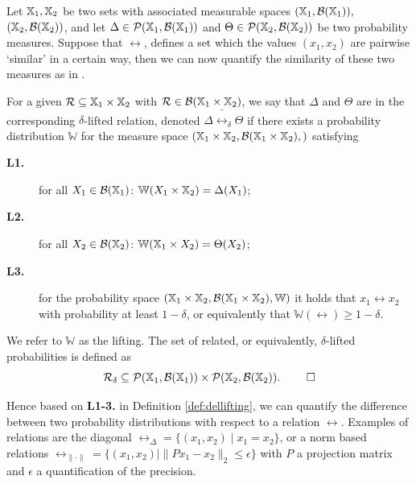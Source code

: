 \documentclass{ifacconf}
\renewcommand{\axx}[1]{{\color{orange} Ali: #1}}
\newcommand{\new}[1]{{\color{blue}#1}}
\begin{document}
	Let ${\mathbb{X}}_1,{\mathbb{X}}_2$ be two sets with associated measurable spaces $({\mathbb{X}}_1,\mathcal B({\mathbb{X}}_1)),$ $({\mathbb{X}}_2,\mathcal B({\mathbb{X}}_2))$,
	and let   $\Delta\in \mathcal{P}({\mathbb{X}}_1,\mathcal B({\mathbb{X}}_1)) $ and  $\Theta\in \mathcal{P}({\mathbb{X}}_2,\mathcal B({\mathbb{X}}_2)) $ be two probability measures.  \new{Suppose that $\rel$, defines a set which the values $(x_1,x_2)$ are pairwise `similar' in a certain way, then we can now quantify the similarity of these two measures as in \cite{haesaert2017verification}.}
%	
\begin{definition}\label{def:dellifting}
For a given 
	$\mathcal{R}\subseteq {\mathbb{X}}_1\times {\mathbb{X}}_2$ with $\mathcal{R}\in \mathcal B({\mathbb{X}}_1\times {\mathbb{X}}_2)$, we say that  $\Delta$ and $ \Theta$ are in the corresponding $\delta$-lifted relation, denoted $\Delta \bar \rel_\delta \Theta$  if there exists a probability distribution $\mathbb W$ for the measure space $({\mathbb{X}}_1\times {\mathbb{X}}_2,\mathcal B({\mathbb{X}}_1\times {\mathbb{X}}_2),)$
	satisfying { \setlength{\parskip}{-1pt}\setlength{\parsep}{0pt}
		\begin{description}
			\item[\textbf{L1.}] for all $X_1\in \mathcal{B}({\mathbb{X}}_1)$: $\mathbb W(X_1\times {\mathbb{X}}_2)=\Delta(X_1)$;
			\item [\textbf{L2.}] for all $X_2\in \mathcal{B}({\mathbb{X}}_2)$:  $\mathbb W({\mathbb{X}}_1\times X_2)=\Theta(X_2)$;
			\item[\textbf{L3.}] for the probability space  $({\mathbb{X}}_1\times {\mathbb{X}}_2,\mathcal B({\mathbb{X}}_1\times {\mathbb{X}}_2), \mathbb W)$ it holds that
			$x_1\rel x_2$ with probability at least $1-\delta$, or equivalently that $\mathbb{W}\left(\rel\right)\geq1-\delta$.
	\end{description}}%
	
We refer to  $\mathbb W$ as the lifting. %
The set of related, or equivalently, $\delta$-lifted probabilities is defined as 
	\[\bar\rel_\delta\subseteq \mathcal{P}(\X_1,\mathcal B(\X_1))\times \mathcal{P}(\X_2,\mathcal B(\X_2)). \hfill \mbox{ }\qed\] 

\end{definition}

Hence based on \textbf{L1-3.} in Definition \ref{def:dellifting}, we can quantify the difference between two probability distributions with respect to a relation $\rel$.  \new{Examples of relations are the diagonal $\rel_{\Delta}=\{(x_1,x_2){\mid} x_1=x_2\}$, or a norm based relations $\rel_{\|\cdot\|}=\{(x_1,x_2){\mid} \|Px_1-x_2\|_2\leq \epsilon\}$ with  $P$  a projection matrix and $\epsilon$ a quantification of the precision. }
 
\end{document}
